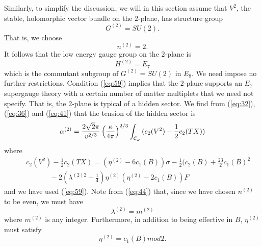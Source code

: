 \documentclass[a4paper,12pt]{article}
\numberwithin{equation}{section}
\theoremstyle{plain}
\begin{document}
Similarly, to simplify the discussion, we will in this section assume that
$V^{2}$, the stable, holomorphic vector bundle on the $2$-plane, has
structure group
%
\begin{equation}
G^{(2)}=SU(2).
\label{eq:58}
\end{equation}
%
That is, we choose
%
\begin{equation}
n^{(2)}=2.
\label{eq:59}
\end{equation}
%
It follows that the low energy gauge group on the $2$-plane is
%
\begin{equation}
H^{(2)}= E_{7}
\label{eq:60}
\end{equation}
%
which is the commutant subgroup of $G^{(2)}=SU(2)$ in $E_{8}$. We need impose
no further restrictions. Condition (\ref{eq:59}) implies that
the $2$-plane supports an $E_{7}$ supergauge theory with a certain number of
matter multiplets that we need not specify. That is, the $2$-plane is typical
of a hidden sector. We find from (\ref{eq:32}), (\ref{eq:36}) 
and (\ref{eq:41}) that the tension of the hidden sector is
%
\begin{equation}
\alpha^{(2)}=\frac{2\sqrt{2}\pi}{v^{2/3}}\left(\frac{\kappa}{4\pi}\right)^{2/3}
\int_{{\cal{C}}_{\omega}}{(c_{2}(V^{2})-\frac{1}{2}c_{2}(TX))}
\label{eq:61}
\end{equation}
%
where
%
\begin{eqnarray}
\nonumber
& & c_{2}(V^{2})-\frac{1}{2}c_{2}(TX)=(\eta^{(2)}-6c_{1}(B))\sigma
-\frac{1}{2}(c_{2}(B)+\frac{23}{2}c_{1}(B)^{2} \\
& & \;\;\;\;\;\;\;\;\;\;\;\;-2\left(\lambda^{(2)2}-\frac{1}{4}\right)\eta^{(2)}(\eta^{(2)}-2c_{1}(B))F
\label{eq:62}
\end{eqnarray}
%
and we have used (\ref{eq:59}). Note from (\ref{eq:44}) that, 
since we have chosen $n^{(2)}$ to be even, we must have
%
\begin{equation}
\lambda^{(2)}=m^{(2)}
\label{eq:63}
\end{equation}
%
where $m^{(2)}$ is any integer. Furthermore, in addition to being effective in
$B$, $\eta^{(2)}$ must satisfy
%
\begin{equation}
\eta^{(2)}=c_{1}(B) mod2.
\label{eq:64}
\end{equation}
%
\end{document}
